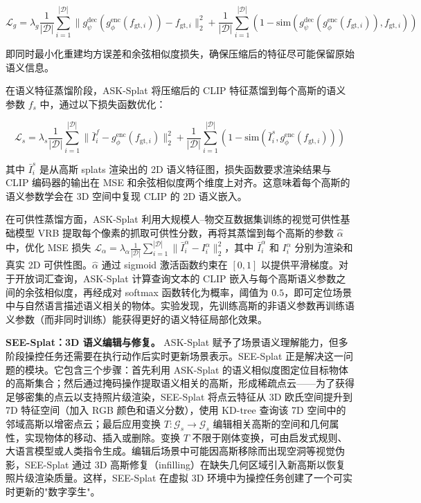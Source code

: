 \begin{equation}
    \mathcal{L}_g = \lambda_g \frac{1}{|\mathcal{D}|} \sum_{i=1}^{|\mathcal{D}|} \|g_\psi^{\text{dec}}(g_\phi^{\text{enc}}(f_{\text{gt},i})) - f_{\text{gt},i}\|_2^2 + \frac{1}{|\mathcal{D}|} \sum_{i=1}^{|\mathcal{D}|} (1 - \text{sim}(g_\psi^{\text{dec}}(g_\phi^{\text{enc}}(f_{\text{gt},i})), f_{\text{gt},i}))
\end{equation}

即同时最小化重建均方误差和余弦相似度损失，确保压缩后的特征尽可能保留原始语义信息。

在语义特征蒸馏阶段，ASK-Splat 将压缩后的 CLIP 特征蒸馏到每个高斯的语义参数 $f_s$ 中，通过以下损失函数优化：

\begin{equation}
    \mathcal{L}_s = \lambda_s \frac{1}{|\mathcal{D}|} \sum_{i=1}^{|\mathcal{D}|} \|\bar{I}_i^f - g_\phi^{\text{enc}}(f_{\text{gt},i})\|_2^2 + \frac{1}{|\mathcal{D}|} \sum_{i=1}^{|\mathcal{D}|} (1 - \text{sim}(\bar{I}_i^s, g_\phi^{\text{enc}}(f_{\text{gt},i})))
\end{equation}

其中 $\bar{I}_i^s$ 是从高斯 splats 渲染出的 2D 语义特征图，损失函数要求渲染结果与 CLIP 编码器的输出在 MSE 和余弦相似度两个维度上对齐。这意味着每个高斯的语义参数学会在 3D 空间中复现 CLIP 的 2D 语义嵌入。

在可供性蒸馏方面，ASK-Splat 利用大规模人--物交互数据集训练的视觉可供性基础模型 VRB 提取每个像素的抓取可供性分数，再将其蒸馏到每个高斯的参数 $\hat{\alpha}$ 中，优化 MSE 损失 $\mathcal{L}_\alpha = \lambda_\alpha \frac{1}{|\mathcal{D}|} \sum_{i=1}^{|\mathcal{D}|} \|\bar{I}_i^\alpha - I_i^\alpha\|_2^2$，其中 $\bar{I}_i^\alpha$ 和 $I_i^\alpha$ 分别为渲染和真实 2D 可供性图。$\hat{\alpha}$ 通过 sigmoid 激活函数约束在 $[0,1]$ 以提供平滑梯度。对于开放词汇查询，ASK-Splat 计算查询文本的 CLIP 嵌入与每个高斯语义参数之间的余弦相似度，再经成对 softmax 函数转化为概率，阈值为 $0.5$，即可定位场景中与自然语言描述语义相关的物体。实验发现，先训练高斯的非语义参数再训练语义参数（而非同时训练）能获得更好的语义特征局部化效果。

\textbf{SEE-Splat：3D 语义编辑与修复。}
ASK-Splat 赋予了场景语义理解能力，但多阶段操控任务还需要在执行动作后实时更新场景表示。SEE-Splat 正是解决这一问题的模块。它包含三个步骤：首先利用 ASK-Splat 的语义相似度图定位目标物体的高斯集合；然后通过掩码操作提取语义相关的高斯，形成稀疏点云——为了获得足够密集的点云以支持照片级渲染，SEE-Splat 将点云特征从 3D 欧氏空间提升到 7D 特征空间（加入 RGB 颜色和语义分数），使用 KD-tree 查询该 7D 空间中的邻域高斯以增密点云；最后应用变换 $T: \mathcal{G}_s \to \mathcal{G}_s$ 编辑相关高斯的空间和几何属性，实现物体的移动、插入或删除。变换 $T$ 不限于刚体变换，可由启发式规则、大语言模型或人类指令生成。编辑后场景中可能因高斯移除而出现空洞等视觉伪影，SEE-Splat 通过 3D 高斯修复（infilling）在缺失几何区域引入新高斯以恢复照片级渲染质量。这样，SEE-Splat 在虚拟 3D 环境中为操控任务创建了一个可实时更新的"数字孪生"。

